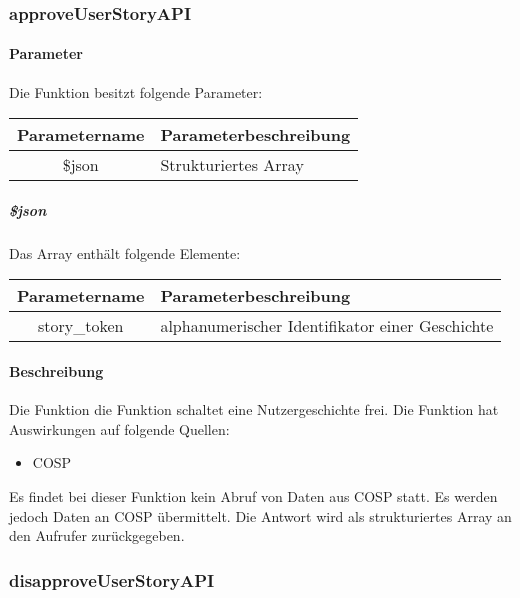 \subsubsection{approveUserStoryAPI}
\paragraph{Parameter} Die Funktion besitzt folgende Parameter:
\begin{table}[H]
	\begin{tabular}{|c|p{11cm}|}
		\hline
		\textbf{Parametername} & \textbf{Parameterbeschreibung} \\ \hline
		\$json & Strukturiertes Array \\ \hline
	\end{tabular}
\end{table}
\subparagraph{\$json}Das Array enthält folgende Elemente:
\begin{table}[H]
	\begin{tabular}{|c|p{11cm}|}
		\hline
		\textbf{Parametername} & \textbf{Parameterbeschreibung} \\ \hline
		story\_token & alphanumerischer Identifikator einer Geschichte \\ \hline
	\end{tabular}
\end{table}
\paragraph{Beschreibung} Die Funktion die Funktion schaltet eine Nutzergeschichte frei. Die Funktion hat Auswirkungen auf folgende Quellen:
\begin{itemize}
	\item COSP
\end{itemize}
Es findet bei dieser Funktion kein Abruf von Daten aus {\glqq COSP\grqq} statt. Es werden jedoch Daten an {\glqq COSP\grqq} übermittelt. Die Antwort wird als strukturiertes Array an den Aufrufer zurückgegeben.
\subsubsection{disapproveUserStoryAPI}
